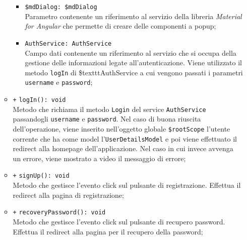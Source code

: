 \begin{itemize}
\begin{itemize}
\begin{itemize}
				\item \texttt{\$mdDialog: \$mdDialog} \\
				Parametro contenente un riferimento al servizio della libreria \textit{Material for Angular} che permette di creare delle componenti a popup;
				\item \texttt{AuthService: AuthService} \\
				Campo dati contenente un riferimento al servizio che si occupa della gestione delle informazioni legate all’autenticazione. Viene utilizzato il metodo \texttt{logIn} di \$texttt{AuthService} a cui vengono passati i parametri \texttt{username} e \texttt{password};
			\end{itemize}
		\item \texttt{+} \texttt{logIn(): void} \\
		Metodo che richiama il metodo \texttt{Login} del service \texttt{AuthService} passandogli \texttt{username} e \texttt{password}. Nel caso di buona riuscita dell'operazione, viene inserito nell'oggetto globale \texttt{\$rootScope} l'utente corrente che ha come model l'\texttt{UserDetailsModel} e poi viene effettuato il redirect alla homepage dell'applicazione. Nel caso in cui invece avvenga un errore, viene mostrato a video il messaggio di errore;
		\item \texttt{+} \texttt{signUp(): void} \\
		Metodo che gestisce l’evento click sul pulsante di registrazione. Effettua il redirect alla pagina di registrazione;
		\item \texttt{+} \texttt{recoveryPassword(): void} \\
		Metodo che gestisce l’evento click sul pulsante di recupero password. Effettua il redirect alla pagina per il recupero della password; 
	\end{itemize}
\end{itemize}

